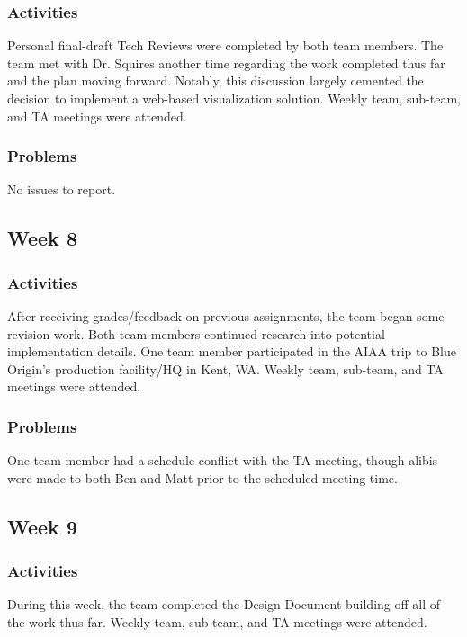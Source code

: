 \documentclass[journal,10pt,onecolumn,compsoc]{IEEEtran}
\begin{document}
		\subsubsection{Activities}
			Personal final-draft Tech Reviews were completed by both team members.
			The team met with Dr. Squires another time regarding the work completed thus far and the plan moving forward.
			Notably, this discussion largely cemented the decision to implement a web-based visualization solution.
			Weekly team, sub-team, and TA meetings were attended.
			
		\subsubsection{Problems}
			No issues to report.
	
	\subsection{Week 8}
	
		\subsubsection{Activities}
			After receiving grades/feedback on previous assignments, the team began some revision work.
			Both team members continued research into potential implementation details.
			One team member participated in the AIAA trip to Blue Origin's production facility/HQ in Kent, WA.
			Weekly team, sub-team, and TA meetings were attended.
		
		\subsubsection{Problems}
			One team member had a schedule conflict with the TA meeting, though alibis were made to both Ben and Matt prior to the scheduled meeting time.
	
	\subsection{Week 9}
		
		\subsubsection{Activities}
			During this week, the team completed the Design Document building off all of the work thus far.
			Weekly team, sub-team, and TA meetings were attended.
		
\end{document}
